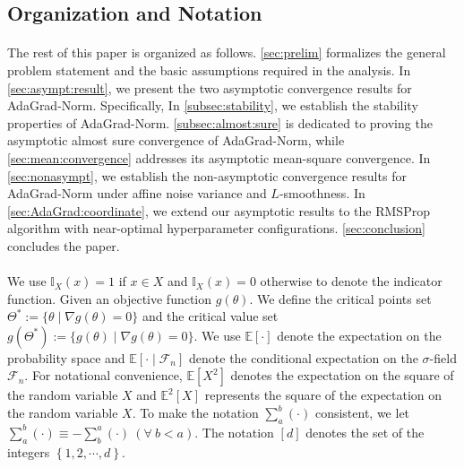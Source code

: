 \documentclass[standalone]{article}
\newcommand{\E}{\mathbb{E}}
\newcommand{\I}{\mathbb{I}}
\begin{document}
\subsection{Organization and Notation}
\paragraph{}The rest of this paper is organized as follows. \cref{sec:prelim} formalizes
the general problem statement and the basic assumptions required in the analysis. %
In \cref{sec:asympt:result}, we present the two asymptotic convergence results for AdaGrad-Norm. Specifically, In \cref{subsec:stability}, we establish the stability properties of AdaGrad-Norm. \cref{subsec:almost:sure} is dedicated to proving the asymptotic almost sure convergence of AdaGrad-Norm, while \cref{sec:mean:convergence} addresses its asymptotic mean-square convergence. In \cref{sec:nonasympt}, we establish the non-asymptotic convergence results for AdaGrad-Norm under affine noise variance and \(L\)-smoothness. In \cref{sec:AdaGrad:coordinate}, we extend our asymptotic results to the RMSProp algorithm with near-optimal hyperparameter configurations. \cref{sec:conclusion} concludes the paper. 

\paragraph{} We use $\I_{X}(x) = 1 $ if $x \in X$ and $\I_{X}(x) = 0$ otherwise to denote the indicator function. Given an objective function $g(\theta)$. We define the critical points set $\Theta^{\ast}:=\{\theta \mid \nabla g(\theta)=0\}$ and the critical value set $g(\Theta^{\ast}):=\{g(\theta) \mid \nabla g(\theta)=0\}$. We use $\E[\cdot]$ denote the expectation on the probability space and $\E[\cdot \mid \mathscr{F}_{n}]$ denote the conditional expectation on the $\sigma$-field $\mathscr{F}_{n}$. For notational convenience, $\E[X^2]$ denotes the expectation on the square of the random variable $X$ and $\E^2[X]$ represents the square of the expectation on the random variable $X$. To make the notation $\sum_{a}^{b}(\cdot)$ consistent, we let $\sum_{a}^{b}(\cdot) \equiv -\sum_{b}^{a}(\cdot)\ (\forall\ b< a).$ The notation $[d]$ denotes the set of the integers $\left\lbrace 1,2,\cdots, d\right\rbrace$.
\end{document}
